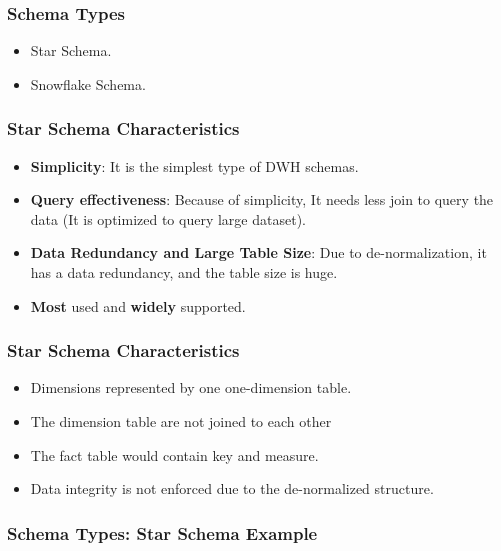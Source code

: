 \VideoClassification[column=2, colour=red]

\begin{frame}
\frametitle{Schema Types}
	\begin{itemize}[<+->]
		\item Star Schema.
		\item Snowflake Schema.
	\end{itemize}

\end{frame}
\begin{frame}
	\frametitle{Star Schema Characteristics}
	\begin{itemize}[<+->]
		\item \textbf{Simplicity}: It is the simplest type of DWH schemas.
		\item \textbf{Query effectiveness}: Because of simplicity, It needs less join to query the data (It is optimized to query large dataset).
		\item \textbf{Data Redundancy and Large Table Size}: Due to de-normalization, it has a data redundancy, and the table size is huge.
		\item \textbf{Most} used and \textbf{widely} supported.
	\end{itemize}
\end{frame}
\begin{frame}
\frametitle{Star Schema Characteristics}
	\begin{itemize}[<+->]
		\item Dimensions represented by one one-dimension table.
		\item The dimension table are not joined to each other
		\item The fact table would contain key and measure.
		\item Data integrity is not enforced due to the de-normalized structure.
	\end{itemize}
\end{frame}
\begin{frame}
\frametitle{Schema Types: Star Schema Example}

\resizebox{\columnwidth}{!}{%

}
\end{frame}
